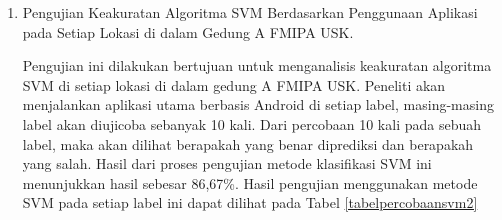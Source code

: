 \begin{enumerate}
	\item Pengujian Keakuratan Algoritma SVM Berdasarkan Penggunaan Aplikasi pada Setiap Lokasi di dalam Gedung A FMIPA USK.

	      \par Pengujian ini dilakukan bertujuan untuk menganalisis keakuratan algoritma SVM di setiap lokasi di dalam gedung A FMIPA USK. Peneliti akan menjalankan aplikasi utama berbasis Android di setiap label, masing-masing label akan diujicoba sebanyak 10 kali. Dari percobaan 10 kali pada sebuah label, maka akan dilihat berapakah yang benar diprediksi dan berapakah yang salah. Hasil dari proses pengujian metode klasifikasi SVM ini menunjukkan hasil sebesar 86,67\%.  Hasil pengujian menggunakan metode SVM pada setiap label ini dapat dilihat pada Tabel \ref{tabelpercobaansvm2}


\end{enumerate}
